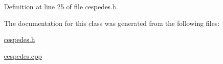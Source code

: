 Definition at line \hyperlink{cespedes_8h_source_l00025}{25} of file \hyperlink{cespedes_8h_source}{cespedes.\+h}.



The documentation for this class was generated from the following files\+:\begin{DoxyCompactItemize}
\item 
\hyperlink{cespedes_8h}{cespedes.\+h}\item 
\hyperlink{cespedes_8cpp}{cespedes.\+cpp}\end{DoxyCompactItemize}
